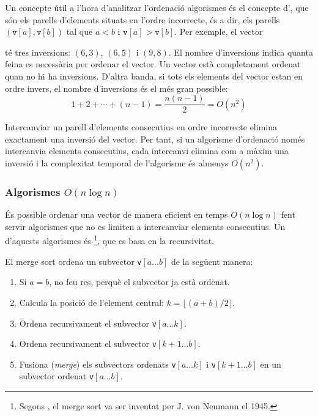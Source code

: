 Un concepte útil a l'hora d'analitzar l'ordenació
algorismes és el concepte d', que són
els parells d'elements situats en l'ordre incorrecte, és
a dir, els parells
$(\texttt{v}[a],\texttt{v}[b])$ tal que
$a<b$ i $\texttt{v}[a]>\texttt{v}[b]$.
Per exemple, el vector
\begin{center}
\end{center}
té tres inversions: $(6,3)$, $(6,5)$ i $(9,8)$.
El nombre d'inversions indica
quanta feina es necessària per ordenar el vector.
Un vector està completament ordenat quan
no hi ha inversions.
D'altra banda, si tots els elements del vector
estan en ordre invers,
el nombre d'inversions és el més gran possible:
\[1+2+\cdots+(n-1)=\frac{n(n-1)}{2} = O(n^2)\]

Intercanviar un parell d'elements consecutius en
ordre incorrecte elimina exactament una inversió
del vector.
Per tant, si un algorisme d'ordenació només
intercanvia elements consecutius, cada intercanvi elimina
com a màxim una inversió i la complexitat temporal
de l'algorisme és almenys $O(n^2)$.

\subsubsection{Algorismes $O(n \log n)$}


És possible ordenar una vector de manera eficient
en temps $O(n \log n)$ fent servir algorismes
que no es limiten a intercanviar elements consecutius.
Un d'aquests algorismes és \footnote{Segons \cite{knu983},
el merge sort va ser inventat per J. von Neumann el 1945.},
que es basa en la recursivitat.

El merge sort ordena un subvector \texttt{v}$[a \ldots b]$ de la següent manera:

\begin{enumerate}
\item Si $a=b$, no feu res, perquè el subvector ja està ordenat.
\item Calcula la posició de l'element central: $k=\lfloor (a+b)/2 \rfloor$.
\item Ordena recursivament el subvector \texttt{v}$[a \ldots k]$.
\item Ordena recursivament el subvector \texttt{v}$[k+1 \ldots b]$.
\item Fusiona (\emph{merge}) els subvectors ordenats \texttt{v}$[a \ldots k]$ i
\texttt{v}$[k+1 \ldots b]$
en un subvector ordenat \texttt{v}$[a \ldots b]$.
\end{enumerate}

